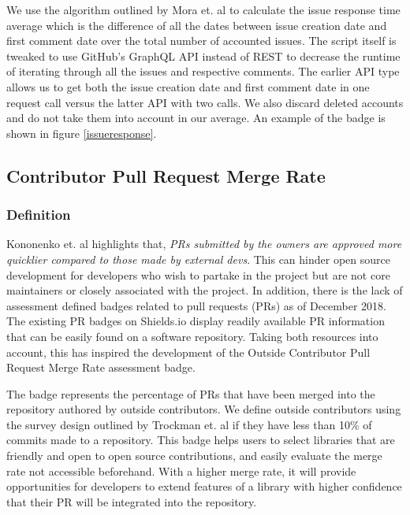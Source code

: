 \documentclass[12pt, letterpaper]{article}
\begin{document}
We use the algorithm outlined by Mora et. al \cite{metrics} to calculate the issue response time average which
is the difference of all the dates between issue creation date and first comment date over the total number of 
accounted issues. 
The script itself is tweaked to use GitHub's \cite{github} GraphQL API instead of REST to decrease the runtime of iterating through
all the issues and respective comments. The earlier API type allows us to get both the issue creation date and first
comment date in one request call versus the latter API with two calls.
We also discard deleted accounts and do not take them into account in our average.
An example of the badge is shown in figure \ref{issueresponse}.


\subsection{Contributor Pull Request Merge Rate}
\subsubsection{Definition}
Kononenko et. al \cite{shopifyarticle} highlights that, \textit{PRs submitted by the owners are approved more
quicklier compared to those made by external devs}. This can hinder open source development
for developers who wish to partake in the project but are not core maintainers or closely associated with the project.
In addition, there is the lack of assessment defined badges \cite{githubbadges} related to pull requests (PRs)
as of December 2018.
The existing PR badges on Shields.io \cite{shields} display readily available PR information that can be easily found on a 
software repository. Taking both resources \cite{shields, shopifyarticle} into account, this has inspired
the development of the Outside Contributor Pull Request Merge Rate assessment badge. 


The badge represents the percentage of PRs that have been merged into the repository authored by outside contributors.
We define outside contributors using the survey design outlined by Trockman et. al \cite{githubbadges} if they have 
less than 10\% of commits made to a repository. 
This badge helps users to select libraries that are friendly and open to open source contributions,
and easily evaluate the merge rate not accessible beforehand.
With a higher merge rate, it will provide opportunities for developers to extend features of a library with 
higher confidence that their PR will be integrated into the repository.
\end{document}
